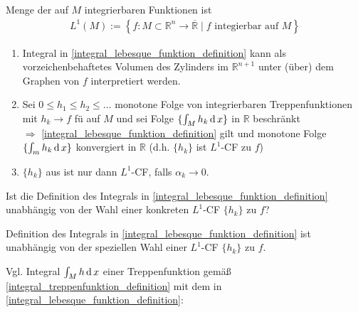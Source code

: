\begin{*definition}
Menge der auf $M$ integrierbaren Funktionen ist  \begin{align*}
	L^1(M) := \left\{ f:M\subset\mathbb{R}^n\to\overline{\mathbb{R}} \mid f \text{ integierbar auf $M$} \right\}
\end{align*}
\end{*definition}

\begin{remark}\vspace*{0pt}
	\begin{enumerate}[label={\alph*)},topsep=\dimexpr -\baselineskip / 2\relax]
		\item Integral in \eqref{integral_lebesque_funktion_definition} kann als vorzeichenbehaftetes Volumen des Zylinders im $\mathbb{R}^{n+1}$ unter (über) dem Graphen von $f$ interpretiert werden.
		\item Sei $0\le h_1 \le h_2 \le \dotsc$ monotone Folge von integrierbaren Treppenfunktionen mit $h_k\to f$ \gls{fü} auf $M$ und sei Folge $\{ \int_M h_k\operatorname{d} x\}$ in $\mathbb{R}$ beschränkt \\
		$\Rightarrow$ \eqref{integral_lebesque_funktion_definition} gilt und monotone Folge $\{ \int_m h_k \operatorname{d} x \}$ konvergiert in $\mathbb{R}$ (d.h. $\{ h_k \}$ ist $L^1$-CF zu $f$)
		\item $\{ h_k\}$ aus  ist nur dann $L^1$-CF, falls $\alpha_k\to 0$.
	\end{enumerate}
\end{remark}

\begin{boldenvironment}[Frage]
	Ist die Definition des Integrals in \eqref{integral_lebesque_funktion_definition} unabhängig von der Wahl einer konkreten $L^1$-CF $\{ h_k\}$ zu $f$?
\end{boldenvironment}

\begin{proposition}
	Definition des Integrals in \eqref{integral_lebesque_funktion_definition} ist unabhängig von der speziellen Wahl einer $L^1$-CF $\{h_k\}$ zu $f$.
\end{proposition}

Vgl. Integral $\int_{M} h \operatorname{d} x$ einer Treppenfunktion gemäß \eqref{integral_treppenfunktion_definition} mit dem in \eqref{integral_lebesque_funktion_definition}:

